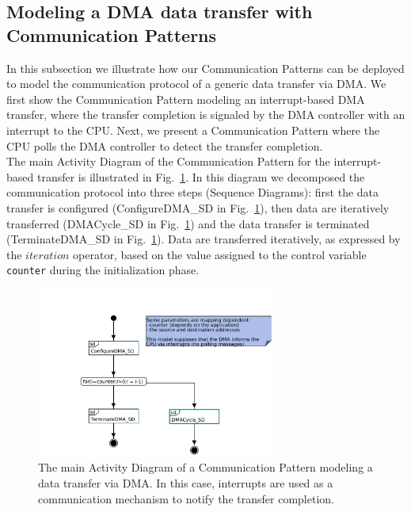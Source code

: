 \documentclass{llncs}
\begin{document}
%
%
\subsection{Modeling a DMA data transfer with Communication Patterns}
\label{subsec:CPExample}
%
In this subsection we illustrate how our Communication Patterns can be deployed to model the communication protocol of a
generic data transfer via DMA. We first show the Communication Pattern modeling
an interrupt-based DMA transfer, where the transfer completion is signaled by the DMA controller with an interrupt to the CPU. Next, we present a Communication
Pattern where the CPU polls the DMA controller to detect the transfer completion.\\

The main Activity Diagram of the Communication Pattern for the interrupt-based transfer is illustrated in
Fig.~\ref{fig:CPforDMA}. In this diagram we decomposed the communication protocol into three steps (Sequence Diagrams):
first the data transfer is configured (ConfigureDMA\_SD in
Fig.~\ref{fig:CPforDMA}), then data are iteratively transferred (DMACycle\_SD in
Fig.~\ref{fig:CPforDMA}) and the data transfer is terminated (TerminateDMA\_SD in Fig.~\ref{fig:CPforDMA}). Data are transferred iteratively, as expressed by the $iteration$ operator, based on the value
assigned to the control variable {\tt counter} during the initialization phase.
%
\begin{figure}[!htbp]
	\centering
	\includegraphics[width=0.7\textwidth]{figures/mainAD_DMA_noPolling.pdf}
	\caption{The main Activity Diagram of a Communication Pattern modeling a data transfer via DMA. In this case,
        interrupts are used as a communication mechanism to notify the transfer completion.}
	\label{fig:CPforDMA}
\end{figure}
%
\end{document}
